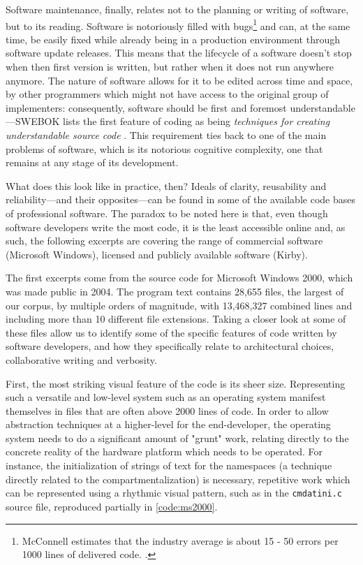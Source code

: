 Software maintenance, finally, relates not to the planning or writing of software, but to its reading. Software is notoriously filled with bugs\footnote{McConnell estimates that the industry average is about 15 - 50 errors per 1000 lines of delivered code. \citep{mcconnell_code_2004}.} and can, at the same time, be easily fixed while already being in a production environment through software update releases. This means that the lifecycle of a software doesn't stop when then first version is written, but rather when it does not run anywhere anymore. The nature of software allows for it to be edited across time and space, by other programmers which might not have access to the original group of implementers: consequently, software should be first and foremost understandable—SWEBOK lists the first feature of coding as being \emph{techniques for creating understandable source code} \citep{bourque_swebok_2014}. This requirement ties back to one of the main problems of software, which is its notorious cognitive complexity, one that remains at any stage of its development.

\vspace{1\baselineskip}

What does this look like in practice, then? Ideals of clarity, reusability and reliability—and their opposites—can be found in some of the available code bases of professional software. The paradox to be noted here is that, even though software developers write the most code, it is the least accessible online and, as such, the following excerpts are covering the range of commercial software (Microsoft Windows), licensed and publicly available software (Kirby).

The first excerpts come from the source code for Microsoft Windows 2000, which was made public in 2004. The program text contains  28,655 files, the largest of our  corpus, by multiple orders of magnitude, with 13,468,327 combined lines and including more than 10 different file extensions. Taking a closer look at some of these files allow us to identify some of the specific features of code written by software developers, and how they specifically relate to architectural choices, collaborative writing and verbosity.

First, the most striking visual feature of the code is its sheer size. Representing such a versatile and low-level system such as an operating system manifest themselves in files that are often above 2000 lines of code. In order to allow abstraction techniques at a higher-level for the end-developer, the operating system needs to do a significant amount of "grunt" work, relating directly to the concrete reality of the hardware platform which needs to be operated. For instance, the initialization of strings of text for the namespaces (a technique directly related to the compartmentalization) is necessary, repetitive work which can be represented using a rhythmic visual pattern, such as in the \lstinline{cmdatini.c} source file, reproduced partially in \ref{code:ms2000}.

